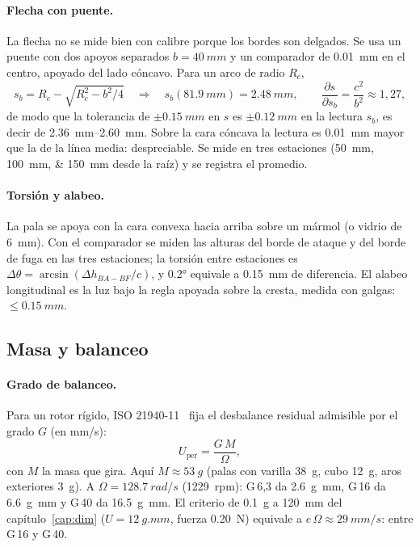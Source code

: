 \paragraph{Flecha con puente.} La flecha no se mide bien con calibre porque los bordes son
delgados. Se usa un puente con dos apoyos separados $b=\SI{40}{mm}$ y un comparador de
\SI{0.01}{mm} en el centro, apoyado del lado cóncavo. Para un arco de radio $R_c$,
\begin{equation}
  s_b = R_c - \sqrt{R_c^2 - b^2/4}
  \quad\Rightarrow\quad
  s_b(\SI{81.9}{mm}) = \SI{2.48}{mm},\qquad
  \frac{\partial s}{\partial s_b}=\frac{c^2}{b^2}\approx1{,}27 ,
  \label{eq:fabricacion-puente}
\end{equation}
de modo que la tolerancia de $\pm\SI{0.15}{mm}$ en $s$ es $\pm\SI{0.12}{mm}$ en la lectura
$s_b$, es decir de \SIrange{2.36}{2.60}{mm}. Sobre la cara cóncava la lectura es
\SI{0.01}{mm} mayor que la de la línea media: despreciable. Se mide
en tres estaciones (\SIlist{50;100;150}{mm} desde la raíz) y se registra el promedio.

\paragraph{Torsión y alabeo.} La pala se apoya con la cara convexa hacia arriba sobre un
mármol (o vidrio de \SI{6}{mm}). Con el comparador se miden las alturas del borde de
ataque y del borde de fuga en las tres estaciones; la torsión entre estaciones es
$\Delta\theta=\arcsin\left(\Delta h_{BA-BF}/c\right)$, y \ang{0.2} equivale a
\SI{0.15}{mm} de diferencia. El alabeo longitudinal es la luz bajo la regla apoyada sobre
la cresta, medida con galgas: $\le\SI{0.15}{mm}$.

\subsection{Masa y balanceo}\label{sec:fabricacion-balanceo}

\paragraph{Grado de balanceo.} Para un rotor rígido, ISO 21940-11~\cite{fabricacion-iso21940}
fija el desbalance residual admisible por el grado $G$ (en \si{mm/s}):
\begin{equation}
  U_{\text{per}} = \frac{G\,M}{\Omega},
  \label{eq:fabricacion-G}
\end{equation}
con $M$ la masa que gira. Aquí $M\approx\SI{53}{g}$ (palas con varilla \SI{38}{g}, cubo
\SI{12}{g}, aros exteriores \SI{3}{g}). A $\Omega=\SI{128.7}{rad/s}$ (\num{1229}~rpm):
G\,6,3 da \SI{2.6}{g.mm}, G\,16 da \SI{6.6}{g.mm} y G\,40 da \SI{16.5}{g.mm}. El criterio
de \SI{0.1}{g} a \SI{120}{mm} del capítulo~\ref{cap:dim} ($U=\SI{12}{g.mm}$, fuerza
\SI{0.20}{N}) equivale a $e\,\Omega\approx\SI{29}{mm/s}$: entre G\,16 y G\,40.

